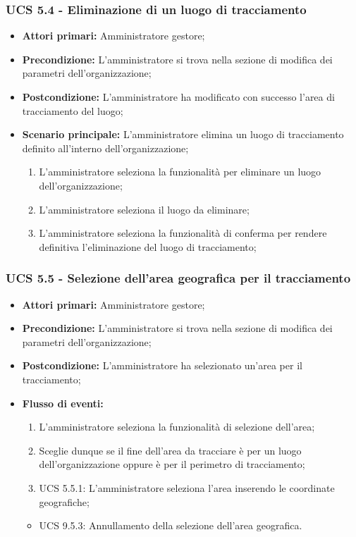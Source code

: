 \subsubsection{UCS 5.4 - Eliminazione di un luogo di tracciamento}%
\begin{itemize}
    \item \textbf{Attori primari:} Amministratore gestore;
    \item \textbf{Precondizione:} L'amministratore si trova nella sezione di modifica dei parametri dell'organizzazione;
    \item \textbf{Postcondizione:} L'amministratore ha modificato con successo l'area di tracciamento del luogo;
    \item \textbf{Scenario principale:} L'amministratore elimina un luogo di tracciamento definito all'interno dell'organizzazione;
    \begin{enumerate}%
        \item L'amministratore seleziona la funzionalità per eliminare un luogo dell'organizzazione;
        \item L'amministratore seleziona il luogo da eliminare;
        \item L'amministratore seleziona la funzionalità di conferma per rendere definitiva l'eliminazione del luogo di tracciamento;
    \end{enumerate}
\end{itemize}

\subsubsection{UCS 5.5 - Selezione dell'area geografica per il tracciamento}%
\begin{itemize}
\item \textbf{Attori primari:} Amministratore gestore;
\item \textbf{Precondizione:} L'amministratore si trova nella sezione di modifica dei parametri dell'organizzazione;
\item \textbf{Postcondizione:} L'amministratore ha selezionato un'area per il tracciamento;
\item \textbf{Flusso di eventi:}
\begin{enumerate}
    \item L'amministratore seleziona la funzionalità di selezione dell'area;
    \item Sceglie dunque se il fine dell'area da tracciare è per un luogo dell'organizzazione oppure è per il perimetro di tracciamento;
    \item UCS 5.5.1: L'amministratore seleziona l'area inserendo le coordinate geografiche;
\end{enumerate}
\begin{itemize}
    \item UCS 9.5.3: Annullamento della selezione dell'area geografica.
\end{itemize}
\end{itemize}

